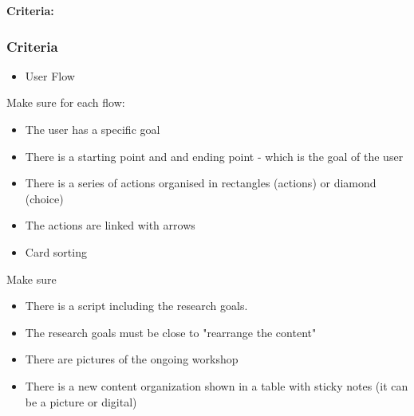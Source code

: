\textbf{Criteria:}

\subsubsection*{Criteria}

\begin{itemize}
\item User Flow
\end{itemize}

Make sure for each flow:

\begin{itemize}
\item The user has a specific goal
\item There is a starting point and and ending point - which is the goal of the user
\item There is a series of actions organised in rectangles (actions) or diamond (choice)
\item The actions are linked with arrows
\end{itemize}

\begin{itemize}
\item Card sorting
\end{itemize}

Make sure

\begin{itemize}
\item There is a script including the research goals.
\item The research goals must be close to "rearrange the content"
\item There are pictures of the ongoing workshop
\item There is a new content organization shown in a table with sticky notes (it can be a picture or digital)
\end{itemize}

